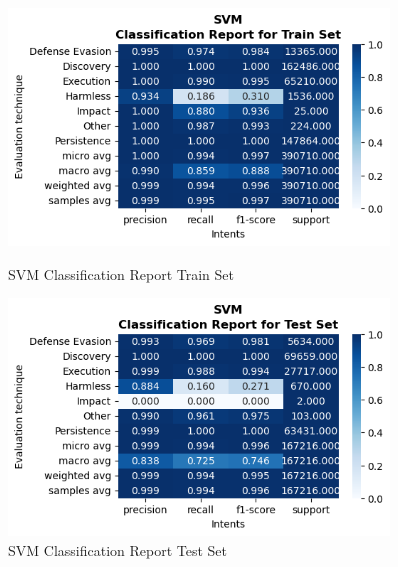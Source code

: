 \begin{figure}[H]
            \vspace{0.5cm}  %

            \begin{minipage}{\textwidth}
                \begin{minipage}[t]{0.48\textwidth}
                    \centering
                    \includegraphics[width=0.9\textwidth]{../figures/plots/section2/SVM_classification_report_for_Train_set.png}
                    \caption{SVM Classification Report Train Set}
                    \label{fig:}
                \end{minipage}%
                \hfill%
                \begin{minipage}[t]{0.48\textwidth}
                    \centering
                    \includegraphics[width=0.9\textwidth]{../figures/plots/section2/SVM_classification_report_for_Test_set.png}
                    \caption{SVM Classification Report Test Set}
                    \label{fig:}
                \end{minipage}  
            
            \end{minipage}
            
        \end{figure}
